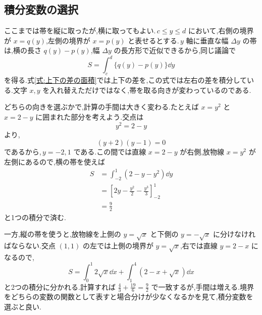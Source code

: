 \subsection{積分変数の選択}

ここまでは帯を縦に取ったが,横に取ってもよい.\,$c\le y\le d$ において,右側の境界が $x=q(y)$,左側の境界が $x=p(y)$ と表せるとする.\,$y$ 軸に垂直な幅 $\Delta y$ の帯は,横の長さ $q(y)-p(y)$,幅 $\Delta y$ の長方形で近似できるから,同じ議論で
\begin{equation}\label{式:左右の差の面積}
S=\int_c^d\{q(y)-p(y)\}\dd y
\end{equation}
を得る.式\eqref{式:上下の差の面積}では上下の差を,この式では左右の差を積分している.文字 $x,y$ を入れ替えただけではなく,帯を取る向きが変わっているのである.

どちらの向きを選ぶかで,計算の手間は大きく変わる.たとえば $x=y^2$ と $x=2-y$ に囲まれた部分を考えよう.交点は
\[
y^2=2-y
\]
より,
\[
(y+2)(y-1)=0
\]
であるから,\,$y=-2,1$ である.この間では直線 $x=2-y$ が右側,放物線 $x=y^2$ が左側にあるので,横の帯を使えば
\begin{align*}
S&=\int_{-2}^1(2-y-y^2)\dd y\\
 &=\left[2y-\frac{y^2}{2}-\frac{y^3}{3}\right]_{-2}^1\\
 &=\frac92
\end{align*}
と1つの積分で済む.

一方,縦の帯を使うと,放物線を上側の $y=\sqrt x$ と下側の $y=-\sqrt x$ に分けなければならない.交点 $(1,1)$ の左では上側の境界が $y=\sqrt x$,右では直線 $y=2-x$ になるので,
\[
S=\int_0^1 2\sqrt x\dd x+\int_1^4\left(2-x+\sqrt x\right)\dd x
\]
と2つの積分に分かれる.計算すれば $\frac43+\frac{19}{6}=\frac92$ で一致するが,手間は増える.境界をどちらの変数の関数として表すと場合分けが少なくなるかを見て,積分変数を選ぶと良い.
